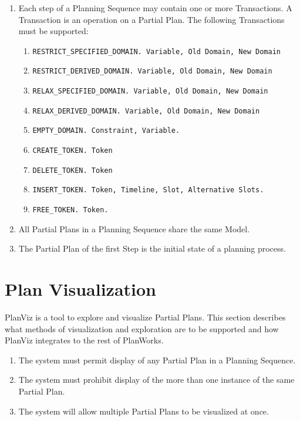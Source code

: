 \documentclass[twoside, 11pt]{article}
\begin{document}
\begin{enumerate}
\item Each step of a Planning Sequence may contain one or more Transactions. A Transaction is an operation on a Partial Plan. The following Transactions must be supported:
\begin{enumerate}
\item \begin{verbatim}RESTRICT_SPECIFIED_DOMAIN. Variable, Old Domain, New Domain\end{verbatim}
\item \begin{verbatim}RESTRICT_DERIVED_DOMAIN. Variable, Old Domain, New Domain\end{verbatim}
\item \begin{verbatim}RELAX_SPECIFIED_DOMAIN. Variable, Old Domain, New Domain\end{verbatim}
\item \begin{verbatim}RELAX_DERIVED_DOMAIN. Variable, Old Domain, New Domain\end{verbatim}
\item \begin{verbatim}EMPTY_DOMAIN. Constraint, Variable.\end{verbatim}
\item \begin{verbatim}CREATE_TOKEN. Token\end{verbatim}
\item \begin{verbatim}DELETE_TOKEN. Token\end{verbatim}
\item \begin{verbatim}INSERT_TOKEN. Token, Timeline, Slot, Alternative Slots.\end{verbatim}
\item \begin{verbatim}FREE_TOKEN. Token.\end{verbatim}
\end{enumerate}
\item All Partial Plans in a Planning Sequence share the same Model.
\item The Partial Plan of the first Step is the initial state of a planning process.
\end{enumerate}

\section{Plan Visualization}
PlanViz is a tool to explore and visualize Partial Plans. This section describes what methods of visualization and exploration are to be supported and how PlanViz integrates to the rest of PlanWorks.
\begin{enumerate}
\item The system must permit display of any Partial Plan in a Planning Sequence.
\item The system must prohibit display of the more than one instance of the same Partial Plan.
\item The system will allow multiple Partial Plans to be visualized at once.
\end{enumerate}
\end{document}
